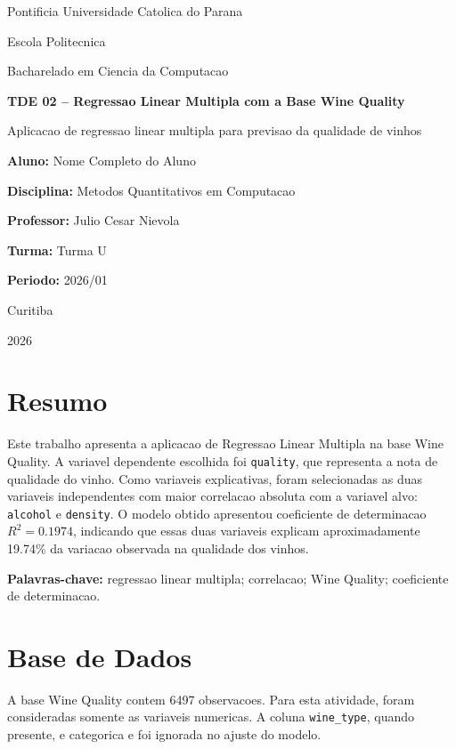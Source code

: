 \documentclass[12pt,a4paper]{article}
\newcommand{\aluno}{Nome Completo do Aluno}
\newcommand{\disciplina}{Metodos Quantitativos em Computacao}
\newcommand{\professor}{Julio Cesar Nievola}
\newcommand{\curso}{Bacharelado em Ciencia da Computacao}
\newcommand{\turma}{Turma U}
\newcommand{\instituicao}{Pontificia Universidade Catolica do Parana}
\newcommand{\titulo}{TDE 02 -- Regressao Linear Multipla com a Base Wine Quality}
\newcommand{\descricao}{Aplicacao de regressao linear multipla para previsao da qualidade de vinhos}
\begin{document}
\begin{titlepage}
\begin{center}
\instituicao

Escola Politecnica

\curso

\vfill
{\bfseries\Large \titulo\par}
\vspace{1cm}
{\large \descricao\par}
\vfill
\begin{flushleft}
\textbf{Aluno:} \aluno

\textbf{Disciplina:} \disciplina

\textbf{Professor:} \professor

\textbf{Turma:} \turma

\textbf{Periodo:} 2026/01
\end{flushleft}
\vfill
Curitiba

2026
\end{center}
\end{titlepage}

\newpage
\section*{Resumo}

Este trabalho apresenta a aplicacao de Regressao Linear Multipla na base Wine Quality. A variavel dependente escolhida foi \texttt{quality}, que representa a nota de qualidade do vinho. Como variaveis explicativas, foram selecionadas as duas variaveis independentes com maior correlacao absoluta com a variavel alvo: \texttt{alcohol} e \texttt{density}. O modelo obtido apresentou coeficiente de determinacao $R^2=0.1974$, indicando que essas duas variaveis explicam aproximadamente 19.74\% da variacao observada na qualidade dos vinhos.

\textbf{Palavras-chave:} regressao linear multipla; correlacao; Wine Quality; coeficiente de determinacao.

\newpage
\tableofcontents

\newpage
\section{Base de Dados}

A base Wine Quality contem 6497 observacoes. Para esta atividade, foram consideradas somente as variaveis numericas. A coluna \texttt{wine\_type}, quando presente, e categorica e foi ignorada no ajuste do modelo.
\end{document}
